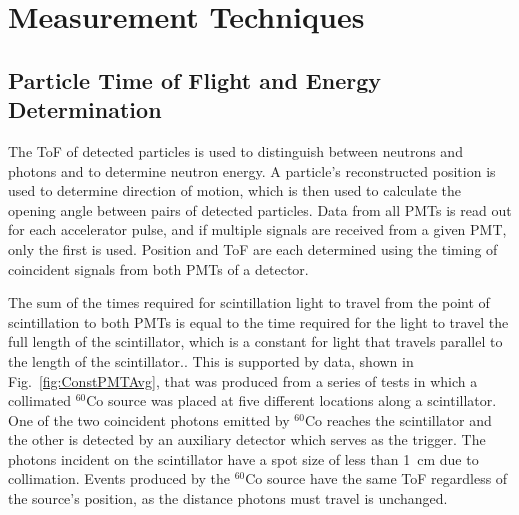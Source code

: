 \section{Measurement Techniques}
\subsection{Particle Time of Flight and Energy Determination}
\label{ToF_reconstruction}
The ToF of detected particles is used to distinguish between neutrons and photons and to determine neutron energy.
A particle's reconstructed position is used to determine direction of motion, which is then used to calculate the opening angle between pairs of detected particles.
Data from all PMTs is read out for each accelerator pulse, and if multiple signals are received from a given PMT, only the first is used.
Position and ToF are each determined using the timing of coincident signals from both PMTs of a detector.

The sum of the times required for scintillation light to travel from the point of scintillation to both PMTs is equal to the time required for the light to travel the full length of the scintillator, which is a constant for light that travels parallel to the length of the scintillator..
This is supported by data, shown in Fig.~\ref{fig:ConstPMTAvg}, that was produced from a series of tests in which a collimated $^{60}$Co source was placed at five different locations along a scintillator.
One of the two coincident photons emitted by $^{60}$Co reaches the scintillator and the other is detected by an auxiliary detector which serves as the trigger. 
The photons incident on the scintillator have a spot size of less than 1~cm due to collimation.
Events produced by the $^{60}$Co source have the same ToF regardless of the source's position, as the distance photons must travel is unchanged. 

